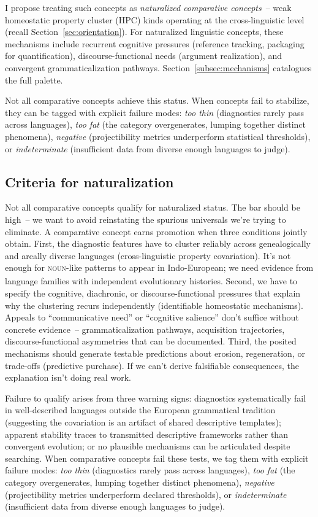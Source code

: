 \documentclass[12pt]{article}
\begin{document}
I propose treating such concepts as \emph{naturalized comparative concepts}~-- weak homeostatic property cluster (HPC) kinds operating at the cross-linguistic level (recall Section~\ref{sec:orientation}). For naturalized linguistic concepts, these mechanisms include recurrent cognitive pressures (reference tracking, packaging for quantification), discourse-functional needs (argument realization), and convergent grammaticalization pathways. Section~\ref{subsec:mechanisms} catalogues the full palette.

Not all comparative concepts achieve this status. When concepts fail to stabilize, they can be tagged with explicit failure modes: \emph{too thin} (diagnostics rarely pass across languages), \emph{too fat} (the category overgenerates, lumping together distinct phenomena), \emph{negative} (projectibility metrics underperform statistical thresholds), or \emph{indeterminate} (insufficient data from diverse enough languages to judge).

\subsection{Criteria for naturalization}\label{subsec:naturalization-criteria}
Not all comparative concepts qualify for naturalized status. The bar should be high~-- we want to avoid reinstating the spurious universals we're trying to eliminate. A comparative concept earns promotion when three conditions jointly obtain. First, the diagnostic features have to  cluster reliably across genealogically and areally diverse languages (cross-linguistic property covariation). It's not enough for \textsc{noun}\textsubscript{\Cross}-like patterns to appear in Indo-European; we need evidence from language families with independent evolutionary histories. Second, we have to  specify the cognitive, diachronic, or discourse-functional pressures that explain why the clustering recurs independently (identifiable homeostatic mechanisms). Appeals to \enquote{communicative need} or \enquote{cognitive salience} don't suffice without concrete evidence~-- grammaticalization pathways, acquisition trajectories, discourse-functional asymmetries that can be documented. Third, the posited mechanisms should generate testable predictions about erosion, regeneration, or trade-offs (predictive purchase). If we can't derive falsifiable consequences, the explanation isn't doing real work.

Failure to qualify arises from three warning signs: diagnostics systematically fail in well-described languages outside the European grammatical tradition (suggesting the covariation is an artifact of shared descriptive templates); apparent stability traces to transmitted descriptive frameworks rather than convergent evolution; or no plausible mechanisms can be articulated despite searching. When comparative concepts fail these tests, we tag them with explicit failure modes: \emph{too thin} (diagnostics rarely pass across languages), \emph{too fat} (the category overgenerates, lumping together distinct phenomena), \emph{negative} (projectibility metrics underperform declared thresholds), or \emph{indeterminate} (insufficient data from diverse enough languages to judge).
\end{document}
